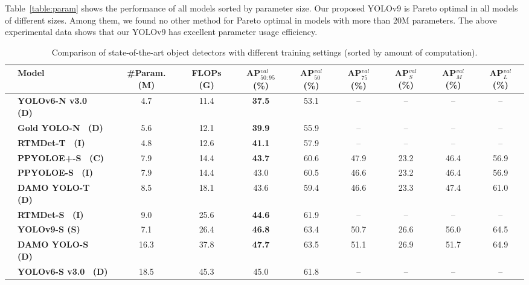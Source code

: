 \documentclass[10pt,twocolumn,letterpaper]{article}
\begin{document}
	Table~\ref{table:param} shows the performance of all models sorted by parameter size. Our proposed YOLOv9 is Pareto optimal in all models of different sizes. Among them, we found no other method for Pareto optimal in models with more than 20M parameters. The above experimental data shows that our YOLOv9 has excellent parameter usage efficiency.
	
	\newpage
	
	\begin{table}[t]
		\centering
		\begin{threeparttable}[t]
			\footnotesize
			\caption{Comparison of state-of-the-art object detectors with different training settings (sorted by amount of computation).}
			\label{table:flops}
			\setlength\tabcolsep{4.0pt}
			\begin{tabular}{l|lcccccccc}
				\toprule
				& \textbf{Model} & \textbf{\#Param. (M)} & \textbf{FLOPs (G)} & \textbf{AP$^{val}_{50:95}$ (\%)} & \textbf{AP$^{val}_{50}$ (\%)} & \textbf{AP$^{val}_{75}$ (\%)} & \textbf{AP$^{val}_{S}$ (\%)} & \textbf{AP$^{val}_{M}$ (\%)} & \textbf{AP$^{val}_{L}$ (\%)} \\
				\midrule
				& \textbf{YOLOv6-N v3.0~\cite{li2023yolov6} (D)} & 4.7 & 11.4 & \textbf{37.5} & 53.1 & -- & -- & -- & -- \\
				& \textbf{Gold YOLO-N~\cite{wang2023gold} (D)} & 5.6 & 12.1 & \textbf{39.9} & 55.9 & -- & -- & -- & -- \\
				& \textbf{RTMDet-T~\cite{lyu2022rtmdet} (I)} & 4.8 & 12.6 & \textbf{41.1} & 57.9 & -- & -- & -- & -- \\
				& \textbf{PPYOLOE+-S~\cite{xu2022pp} (C)} & 7.9 & 14.4 & \textbf{43.7} & 60.6 & 47.9 & 23.2 & 46.4 & 56.9 \\
				& \textbf{PPYOLOE-S~\cite{xu2022pp} (I)} & 7.9 & 14.4 & 43.0 & 60.5 & 46.6 & 23.2 & 46.4 & 56.9 \\
				& \textbf{DAMO YOLO-T~\cite{xu2022damo} (D)} & 8.5 & 18.1 & 43.6 & 59.4 & 46.6 & 23.3 & 47.4 & 61.0 \\
				& \textbf{RTMDet-S~\cite{lyu2022rtmdet} (I)} & 9.0 & 25.6 & \textbf{44.6} & 61.9 & -- & -- & -- & -- \\
				& \textbf{YOLOv9-S (S)} & 7.1 & 26.4 & \textbf{46.8} & 63.4 & 50.7 & 26.6 & 56.0 & 64.5 \\
				& \textbf{DAMO YOLO-S~\cite{xu2022damo} (D)} & 16.3 & 37.8 & \textbf{47.7} & 63.5 & 51.1 & 26.9 & 51.7 & 64.9 \\
				& \textbf{YOLOv6-S v3.0~\cite{li2023yolov6} (D)} & 18.5 & 45.3 & 45.0 & 61.8 & -- & -- & -- & -- \\

\end{tabular}
\end{threeparttable}
\end{table}
\end{document}
